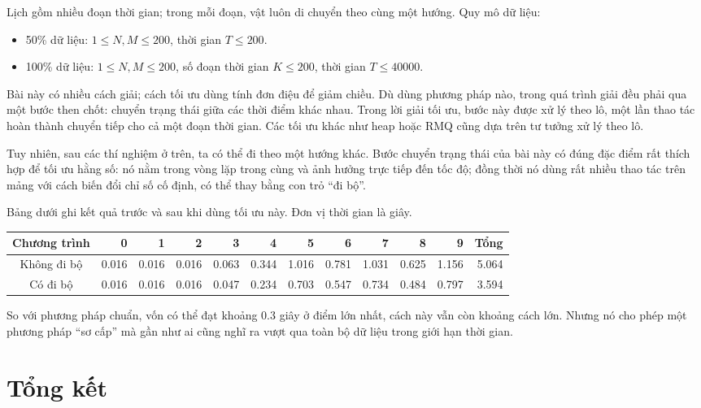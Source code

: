 \documentclass[11pt]{article}
\begin{document}
Lịch gồm nhiều đoạn thời gian; trong mỗi đoạn, vật luôn di chuyển theo cùng
một hướng. Quy mô dữ liệu:
\begin{itemize}
  \item 50\% dữ liệu: \(1\le N,M\le 200\), thời gian \(T\le 200\).
  \item 100\% dữ liệu: \(1\le N,M\le 200\), số đoạn thời gian \(K\le 200\),
  thời gian \(T\le 40000\).
\end{itemize}

Bài này có nhiều cách giải; cách tối ưu dùng tính đơn điệu để giảm chiều. Dù
dùng phương pháp nào, trong quá trình giải đều phải qua một bước then chốt:
chuyển trạng thái giữa các thời điểm khác nhau. Trong lời giải tối ưu, bước
này được xử lý theo lô, một lần thao tác hoàn thành chuyển tiếp cho cả một
đoạn thời gian. Các tối ưu khác như heap hoặc RMQ cũng dựa trên tư tưởng xử lý
theo lô.

Tuy nhiên, sau các thí nghiệm ở trên, ta có thể đi theo một hướng khác. Bước
chuyển trạng thái của bài này có đúng đặc điểm rất thích hợp để tối ưu hằng
số: nó nằm trong vòng lặp trong cùng và ảnh hưởng trực tiếp đến tốc độ; đồng
thời nó dùng rất nhiều thao tác trên mảng với cách biến đổi chỉ số cố định,
có thể thay bằng con trỏ ``đi bộ''.

Bảng dưới ghi kết quả trước và sau khi dùng tối ưu này. Đơn vị thời gian là
giây.

\begin{center}
\scriptsize
\begin{tabular}{c|rrrrrrrrrr|r}
\hline
Chương trình & 0 & 1 & 2 & 3 & 4 & 5 & 6 & 7 & 8 & 9 & Tổng \\
\hline
Không đi bộ & 0.016 & 0.016 & 0.016 & 0.063 & 0.344 & 1.016 &
0.781 & 1.031 & 0.625 & 1.156 & 5.064 \\
Có đi bộ & 0.016 & 0.016 & 0.016 & 0.047 & 0.234 & 0.703 &
0.547 & 0.734 & 0.484 & 0.797 & 3.594 \\
\hline
\end{tabular}
\end{center}

So với phương pháp chuẩn, vốn có thể đạt khoảng \(0.3\) giây ở điểm lớn nhất,
cách này vẫn còn khoảng cách lớn. Nhưng nó cho phép một phương pháp ``sơ cấp''
mà gần như ai cũng nghĩ ra vượt qua toàn bộ dữ liệu trong giới hạn thời gian.

\section{Tổng kết}
\end{document}
